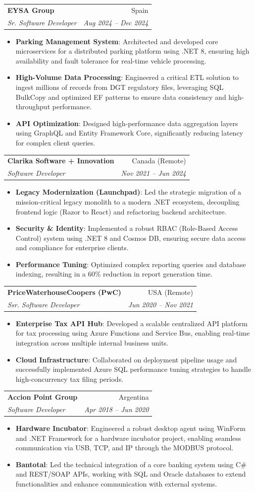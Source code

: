 \documentclass[letterpaper,11pt]{article}
\makeatletter
\newcommand{\resumeItem}[2]{
  \item\small{
    \textbf{#1}{: #2 \vspace{-2pt}}
  }
}
\newcommand{\resumeSubheading}[4]{
  \vspace{-1pt}\item
    \begin{tabular*}{0.97\textwidth}[t]{l@{\extracolsep{\fill}}r}
      \textbf{#1} & #2 \\
      \textit{\small#3} & \textit{\small #4} \\
    \end{tabular*}\vspace{-5pt}
}
\newcommand{\resumeItemListStart}{\begin{itemize}}
\newcommand{\resumeItemListEnd}{\end{itemize}\vspace{-5pt}}
\makeatother
\begin{document}
  \resumeSubheading
  {EYSA Group }{ Spain}
  {Sr. Software Developer}{Aug 2024 -- Dec 2024}
  \resumeItemListStart
    \resumeItem{Parking Management System}
      {Architected and developed core microservices for a distributed parking platform using .NET 8, ensuring high availability and fault tolerance for real-time vehicle processing.}
    \resumeItem{High-Volume Data Processing}
      {Engineered a critical ETL solution to ingest millions of records from DGT regulatory files, leveraging SQL BulkCopy and optimized EF patterns to ensure data consistency and high-throughput performance.}
    \resumeItem{API Optimization}
      {Designed high-performance data aggregation layers using GraphQL and Entity Framework Core, significantly reducing latency for complex client queries.}
  \resumeItemListEnd

    \resumeSubheading
      {Clarika Software + Innovation }{ Canada (Remote)}
      {Software Developer}{Nov 2021 -- Jun 2024}
      \resumeItemListStart
        \resumeItem{Legacy Modernization (Launchpad)}
          {Led the strategic migration of a mission-critical legacy monolith to a modern .NET ecosystem, decoupling frontend logic (Razor to React) and refactoring backend architecture.}
        \resumeItem{Security \& Identity}
          {Implemented a robust RBAC (Role-Based Access Control) system using .NET 8 and Cosmos DB, ensuring secure data access and compliance for enterprise clients.}
        \resumeItem{Performance Tuning}
          {Optimized complex reporting queries and database indexing, resulting in a 60\% reduction in report generation time.}
      \resumeItemListEnd


    \resumeSubheading
      {PriceWaterhouseCoopers (PwC)}{ USA (Remote)}
      {Ssr. Software Developer}{Jun 2020 -- Nov 2021}
      \resumeItemListStart
        \resumeItem{Enterprise Tax API Hub}
          {Developed a scalable centralized API platform for tax processing using Azure Functions and Service Bus, enabling real-time integration across multiple internal business units.}
        \resumeItem{Cloud Infrastructure}
          {Collaborated on deployment pipeline usage and successfully implemented Azure SQL performance tuning strategies to handle high-concurrency tax filing periods.}
      \resumeItemListEnd

    \resumeSubheading
      {Accion Point Group}{Argentina}
      {Software Developer}{Apr 2018 -- Jun 2020}
      \resumeItemListStart
        \resumeItem{Hardware Incubator}
          {Engineered a robust desktop agent using WinForm and .NET Framework for a hardware incubator project, 
          enabling seamless communication via USB, TCP, and IP through the MODBUS protocol.}
        \resumeItem{Bantotal}
          {Led the technical integration of a core banking system using C\# and REST/SOAP APIs, 
          working with SQL and Oracle databases to extend functionalities and enhance communication 
          with external systems.}
      \resumeItemListEnd
\end{document}
